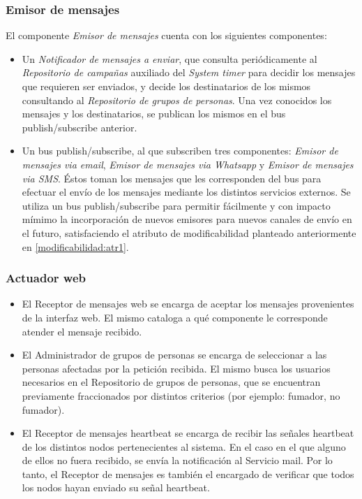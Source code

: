 \documentclass[a4paper, 10pt, twoside]{article}
\begin{document}
\subsubsection{Emisor de mensajes}

El componente \textit{Emisor de mensajes} cuenta con los siguientes componentes:

\begin{itemize}
  \item Un \textit{Notificador de mensajes a enviar}, que consulta periódicamente al \textit{Repositorio de campañas} auxiliado del \textit{System timer} para decidir los mensajes que requieren ser enviados, y decide los destinatarios de los mismos consultando al \textit{Repositorio de grupos de personas}. Una vez conocidos los mensajes y los destinatarios, se publican los mismos en el bus publish/subscribe anterior.

  \item Un bus publish/subscribe, al que subscriben tres componentes: \textit{Emisor de mensajes via email}, \textit{Emisor de mensajes via Whatsapp} y \textit{Emisor de mensajes via SMS}. Éstos toman los mensajes que les corresponden del bus para efectuar el envío de los mensajes mediante los distintos servicios externos. Se utiliza un bus publish/subscribe para permitir fácilmente y con impacto mímimo la incorporación de nuevos emisores para nuevos canales de envío en el futuro, satisfaciendo el atributo de modificabilidad planteado anteriormente en \ref{modificabilidad:atr1}.
\end{itemize}

\subsubsection{Actuador web}

\begin{itemize}
\item El Receptor de mensajes web se encarga de aceptar los mensajes provenientes de la interfaz web. El mismo cataloga a qué componente le corresponde atender el mensaje recibido.
\item El Administrador de grupos de personas se encarga de seleccionar a las personas afectadas por la petición recibida. El mismo busca los usuarios necesarios en el Repositorio de grupos de personas, que se encuentran previamente fraccionados por distintos criterios (por ejemplo: fumador, no fumador).
\item El Receptor de mensajes heartbeat se encarga de recibir las señales heartbeat de los distintos nodos pertenecientes al sistema. En el caso en el que alguno de ellos no fuera recibido, se envía la notificación al Servicio mail. Por lo tanto, el Receptor de mensajes es también el encargado de verificar que todos los nodos hayan enviado su señal heartbeat.
\end{itemize}
\end{document}
